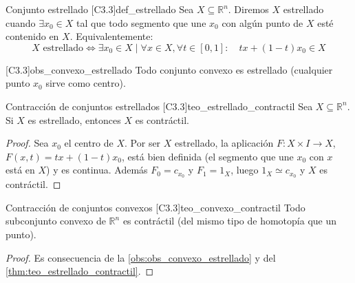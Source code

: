 \begin{definicion}{Conjunto estrellado [C3.3]}{def_estrellado}
Sea $X \subseteq \mathbb{R}^n$. Diremos $X$ estrellado cuando $\exists x_0 \in X$ tal que todo segmento que une $x_0$ con algún punto de $X$ esté contenido en $X$. Equivalentemente:
\[ X \text{ estrellado} \iff \exists x_0 \in X \mid \forall x \in X, \forall t \in [0,1]: \quad tx + (1-t)x_0 \in X \]
\end{definicion}

\begin{observacion}{ [C3.3]}{obs_convexo_estrellado}
Todo conjunto convexo es estrellado (cualquier punto $x_0$ sirve como centro).
\end{observacion}

\begin{teorema}{Contracción de conjuntos estrellados [C3.3]}{teo_estrellado_contractil}
Sea $X \subseteq \mathbb{R}^n$. Si $X$ es estrellado, entonces $X$ es contráctil.
\end{teorema}

\begin{proof}
Sea $x_0$ el centro de $X$. Por ser $X$ estrellado, la aplicación $F \colon X \times I \to X$, $F(x,t) = tx + (1-t)x_0$, está bien definida (el segmento que une $x_0$ con $x$ está en $X$) y es continua. Además $F_0 = c_{x_0}$ y $F_1 = 1_X$, luego $1_X \simeq c_{x_0}$ y $X$ es contráctil.
\end{proof}

\begin{teorema}{Contracción de conjuntos convexos [C3.3]}{teo_convexo_contractil}
Todo subconjunto convexo de $\mathbb{R}^n$ es contráctil (del mismo tipo de homotopía que un punto).
\end{teorema}

\begin{proof}
Es consecuencia de la \cref{obs:obs_convexo_estrellado} y del \cref{thm:teo_estrellado_contractil}.
\end{proof}

